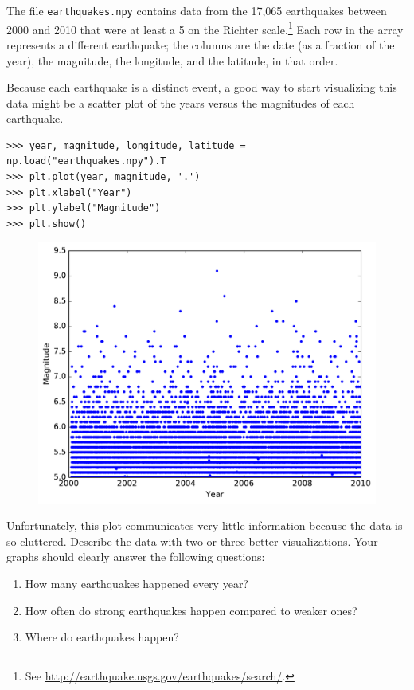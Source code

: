 \begin{problem} %
The file \texttt{earthquakes.npy} contains data from the 17,065 earthquakes between 2000 and 2010 that were at least a 5 on the Richter scale.\footnote{See \url{http://earthquake.usgs.gov/earthquakes/search/}.}
Each row in the array represents a different earthquake;
the columns are the date (as a fraction of the year), the magnitude, the longitude, and the latitude, in that order.

Because each earthquake is a distinct event, a good way to start visualizing this data might be a scatter plot of the years versus the magnitudes of each earthquake.

\begin{lstlisting}
>>> year, magnitude, longitude, latitude = np.load("earthquakes.npy").T
>>> plt.plot(year, magnitude, '.')
>>> plt.xlabel("Year")
>>> plt.ylabel("Magnitude")
>>> plt.show()
\end{lstlisting}

\begin{figure}[H] %
    \centering
    \includegraphics[width=.7\textwidth]{figures/earthquake_bad.pdf}
\end{figure}

Unfortunately, this plot communicates very little information because the data is so cluttered.
Describe the data with two or three better visualizations.
Your graphs should clearly answer the following questions:
\begin{enumerate}
    \item How many earthquakes happened every year?
    \item How often do strong earthquakes happen compared to weaker ones?
    \item Where do earthquakes happen?
\end{enumerate}
\end{problem}

